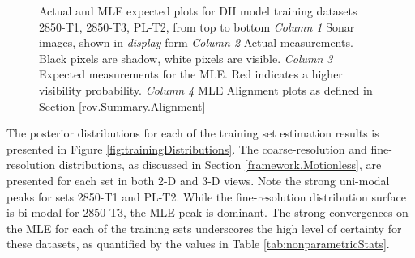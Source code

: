 \begin{figure} [h!]
  	\caption{Actual and MLE expected plots for DH model training datasets 2850-T1, 2850-T3, PL-T2, from top to bottom \emph{Column 1} Sonar images, shown in \emph{display} form \emph{Column 2} Actual measurements. Black pixels are shadow, white pixels are visible. \emph{Column 3} Expected measurements for the MLE. Red indicates a higher visibility probability. \emph{Column 4} MLE Alignment plots as defined in Section \ref{rov.Summary.Alignment}}
	\label{fig:trainingPlots}
\end{figure}
 
The posterior distributions for each of the training set estimation results is presented in Figure \ref{fig:trainingDistributions}.
The coarse-resolution and fine-resolution distributions, as discussed in Section \ref{framework.Motionless}, are presented for each set in both 2-D and 3-D views.
Note the strong uni-modal peaks for sets 2850-T1 and PL-T2.
While the fine-resolution distribution surface is bi-modal for 2850-T3, the MLE peak is dominant.
The strong convergences on the MLE for each of the training sets underscores the high level of certainty for these datasets, as quantified by the values in Table \ref{tab:nonparametricStats}.

